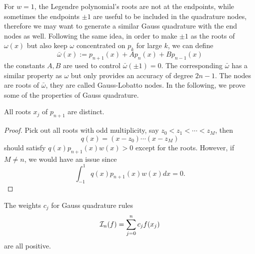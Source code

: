 For $w = 1$, the Legendre polynomial's roots are not at the endpoints, while sometimes the endpoints $\pm 1$ are useful to be included in the quadrature nodes, therefore we may want to generate a similar  Gauss quadrature with the end nodes as well. Following the same idea, in order to make $\pm 1$ as the roots of $\omega(x)$ but also keep $\omega$ concentrated on $p_{k}$ for large $k$, we can define
\begin{equation}
    \bar{\omega}(x) := p_{n+1}(x) + A p_n(x)+Bp_{n-1}(x)
 \end{equation}
the constants $A, B$ are used to control $\bar{\omega}(\pm 1) = 0$. The corresponding $\bar{\omega}$ has a similar property as $\omega$ but only provides an accuracy of degree $2n - 1$. The nodes are roots of $\bar{\omega}$, they are called Gauss-Lobatto nodes. In the following, we prove some of the properties of Gauss quadrature. 
\begin{theorem}
    All roots $x_j$ of $p_{n+1}$ are distinct.
\end{theorem}
\begin{proof}
    Pick out all roots with odd multiplicity, say $z_0 < z_1 <\cdots < z_M$, then 
    \begin{equation}
        q(x) = (x - z_0)\cdots (x - z_M)
\end{equation} should satisfy $q(x)p_{n+1}(x) w(x) > 0$ except for the roots. However, if $M\neq n$, we would have an issue since 
    \begin{equation}
        \int_{-1}^1 q(x) p_{n+1}(x)w(x) dx = 0.
    \end{equation}
\end{proof}
\begin{theorem}
    The weights $c_j$ for Gauss quadrature rules 
    \begin{equation}
        \mathcal I_n(f) = \sum_{j = 0}^n c_j f(x_j)
    \end{equation}
    are all positive. 
\end{theorem}
